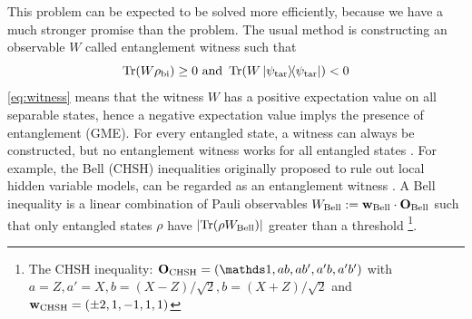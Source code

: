 \documentclass[
aps,
pra,
twocolumn,
floatfix,
]{revtex4-2}
\theoremstyle{plain}
\theoremstyle{definition}
\newtheorem{definition}{Definition}
\newtheorem{remark}{Remark}
\newcommand{\ew}{W}
\newcommand{\pob}{O}
\newcommand{\dm}{\rho}
\newcommand{\bi}{\text{bi}}
\newcommand{\target}{\textup{tar}}
\newcommand{\chsh}{\textup{CHSH}}
\newcommand{\bellineq}{\textup{Bell}}
\newcommand{\px}{X}
\newcommand{\pz}{Z}
\begin{document}
This problem can be expected to be solved more efficiently, because we have a much stronger promise than the  problem.
The usual method is constructing an observable $W$ called entanglement witness such that
\begin{equation}
	\Tr(\ew\dm_{\bi}) \ge 0  \text{ and }
	\Tr(\ew\op{\psi_{\target}}) < 0 
	\label{eq:witness}
\end{equation}
\cref{eq:witness} means that the witness $W$ has a positive expectation value on all separable states, hence a negative expectation value implys the presence of entanglement (GME).
For every entangled state, a witness can always be constructed,
but no entanglement witness works for all entangled states \cite{heinosaariMathematicalLanguageQuantum2011}.
For example, the Bell (CHSH) inequalities originally proposed to rule out local hidden variable models,
can be regarded as an entanglement witness \cite{terhalBellInequalitiesSeparability2000}.
A Bell inequality is a linear combination of Pauli observables $\ew_{\bellineq}:=\vb{w}_{\bellineq}\cdot\vb{\pob}_{\bellineq}$
such that only entangled states $\dm$ have $\abs{\Tr(\dm\ew_{\bellineq})}$ greater than a threshold
\footnote{
	The CHSH inequality:
	$\vb{\pob}_{\chsh}=\qty(\identity, a b, a b', a' b, a' b' )$ with 
	$a = \pz, a' = \px, b = (\px-\pz)/\sqrt{2}, b = (\px+\pz)/\sqrt{2}$
	and $\vb{w}_{\chsh} = \qty(\pm 2, 1, -1, 1, 1)$
}.
\end{document}
